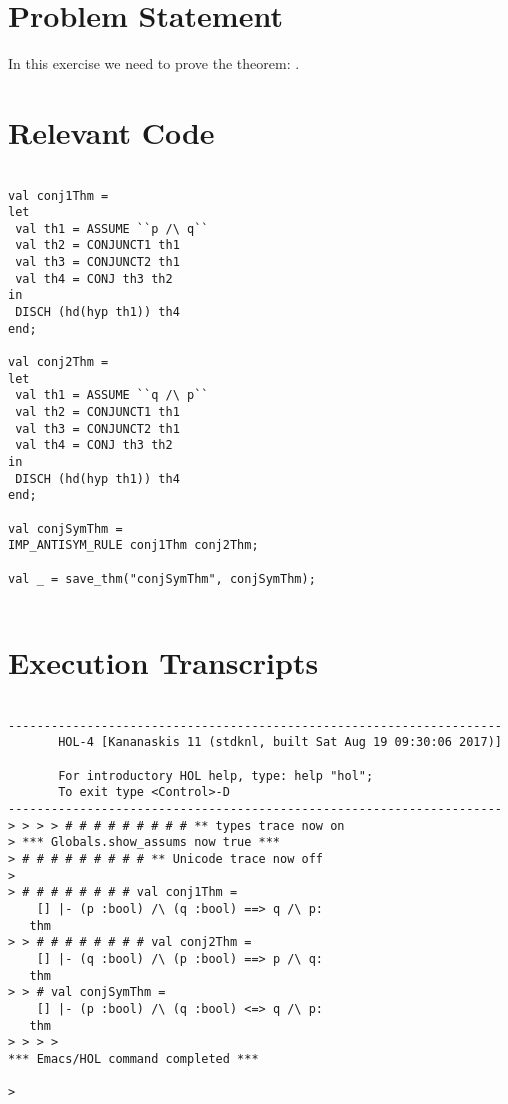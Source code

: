 \documentclass{report}
\begin{document}
 \section{Problem Statement}
 \label{sec:problem-statement-2}

In this exercise we need to prove the theorem:
\HOLTokenTurnstile{} \HOLSymConst{\HOLTokenForall{}} .  \HOLSymConst{\HOLTokenConj{}}  \HOLSymConst{\HOLTokenEquiv{}}  \HOLSymConst{\HOLTokenConj{}} 

\section{Relevant Code}
\label{sec:relevant-code-2}
 \lstset{frameround=fftt}
\begin{lstlisting}[frame=tRBL]

val conj1Thm =
let
 val th1 = ASSUME ``p /\ q``
 val th2 = CONJUNCT1 th1
 val th3 = CONJUNCT2 th1
 val th4 = CONJ th3 th2
in
 DISCH (hd(hyp th1)) th4
end;

val conj2Thm =
let
 val th1 = ASSUME ``q /\ p``
 val th2 = CONJUNCT1 th1
 val th3 = CONJUNCT2 th1
 val th4 = CONJ th3 th2
in
 DISCH (hd(hyp th1)) th4
end;

val conjSymThm =
IMP_ANTISYM_RULE conj1Thm conj2Thm;

val _ = save_thm("conjSymThm", conjSymThm);


\end{lstlisting}


\section{Execution Transcripts}
\label{sec:exec-transcr-2}

\setcounter{sessioncount}{0}
\begin{session}
  \begin{scriptsize}
\begin{verbatim}

---------------------------------------------------------------------
       HOL-4 [Kananaskis 11 (stdknl, built Sat Aug 19 09:30:06 2017)]

       For introductory HOL help, type: help "hol";
       To exit type <Control>-D
---------------------------------------------------------------------
> > > > # # # # # # # # # ** types trace now on
> *** Globals.show_assums now true ***
> # # # # # # # # # ** Unicode trace now off
> 
> # # # # # # # # val conj1Thm =
    [] |- (p :bool) /\ (q :bool) ==> q /\ p:
   thm
> > # # # # # # # # val conj2Thm =
    [] |- (q :bool) /\ (p :bool) ==> p /\ q:
   thm
> > # val conjSymThm =
    [] |- (p :bool) /\ (q :bool) <=> q /\ p:
   thm
> > > > 
*** Emacs/HOL command completed ***

> 

\end{verbatim}
  \end{scriptsize}
\end{session}
\end{document}
